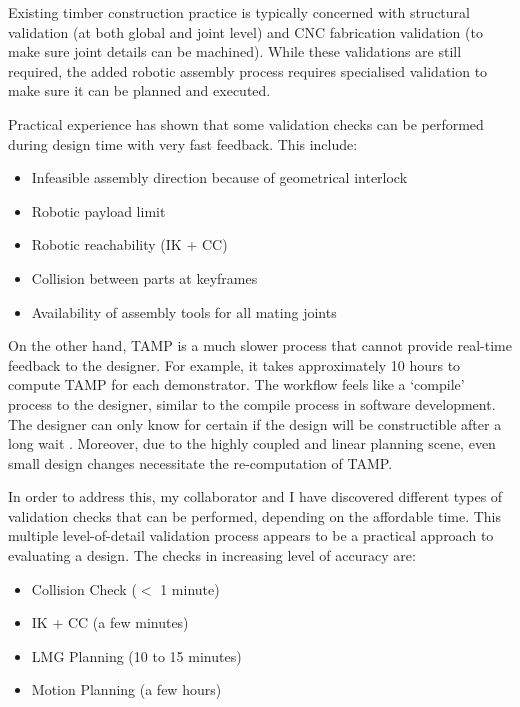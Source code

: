 Existing timber construction practice is typically concerned with structural validation (at both global and joint level) and CNC fabrication validation (to make sure joint details can be machined). While these validations are still required, the added robotic assembly process requires specialised validation to make sure it can be planned and executed. 

Practical experience has shown that some validation checks can be performed during design time with very fast feedback. This include: 

\begin{itemize}
	\item Infeasible assembly direction because of geometrical interlock
	\item Robotic payload limit 
	\item Robotic reachability (IK + CC) 
	\item Collision between parts at keyframes
	\item Availability of assembly tools for all mating joints
\end{itemize}

On the other hand, TAMP is a much slower process that cannot provide real-time feedback to the designer. For example, it takes approximately 10 hours to compute TAMP for each demonstrator. The workflow feels like a ‘compile’ process to the designer, similar to the compile process in software development. The designer can only know for certain if the design will be constructible after a long wait . Moreover, due to the highly coupled and linear planning scene, even small design changes necessitate the re-computation of TAMP.

In order to address this, my collaborator and I have discovered different types of validation checks that can be performed, depending on the affordable time. This multiple level-of-detail validation process appears to be a practical approach to evaluating a design. The checks in increasing level of accuracy are:

\begin{itemize}
	\item Collision Check ($<$ 1 minute)

	\item IK + CC (a few minutes) 

	\item LMG Planning (10 to 15 minutes) 

	\item Motion Planning (a few hours) 

\end{itemize}

